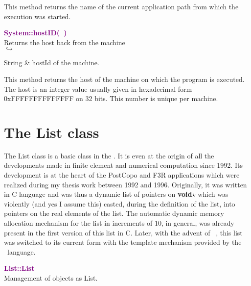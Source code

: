 This method returns the name of the current application path from which the execution was started.

\textcolor{purple}{\textbf{System::hostID(~)}}\label{System::hostID()}\\
Returns the host back from the machine\\ \hspace*{5mm}$\hookrightarrow$
\vspace*{-2em}\begin{tcolorbox}[grow to left by=-1cm, width=\textwidth-1cm,myArgs,tabularx={l|R}]
String & hostId of the machine.
\end{tcolorbox}

This method returns the host of the machine on which the program is executed. The host is an integer value usually given in hexadecimal form 0xFFFFFFFFFFFFFF on 32 bits. This number is unique per machine.

\section{The List class}

The List class is a basic class in the \DynELA. It is even at the origin of all the developments made in finite element and numerical computation since 1992. Its development is at the heart of the PostCopo and F3R applications which were realized during my thesis work between 1992 and 1996. Originally, it was written in C language and was thus a dynamic list of pointers on \textbf{void$\star$} which was violently (and yes I assume this) casted, during the definition of the list, into pointers on the real elements of the list. The automatic dynamic memory allocation mechanism for the list in increments of $10$, in general, was already present in the first version of this list in C. Later, with the advent of \Cpp~, this list was switched to its current form with the template mechanism provided by the \Cpp~language.

\textcolor{purple}{\textbf{List::List}}\label{List::List}\\
Management of objects as List.

